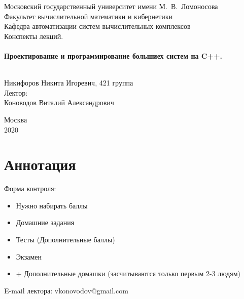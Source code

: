\documentclass[a4paper, 12pt, titlepage, finall]{extreport}
\begin{document}
    \begin{titlepage}
        \begin{center}
            {\small \sc Московский государственный университет имени М.~В.~Ломоносова\\
            Факультет вычислительной математики и кибернетики\\
            Кафедра автоматизации систем вычислительных комплексов\\}
            \vfill
            {\large \sc Конспекты лекций.}\\~\\

            {\large \bf Проектирование и программирование большиех систем на C++.}\\~\\

        \end{center}
        
        \begin{flushright}
            \vfill
            \vfill
            {Никифоров Никита Игоревич, 421 группа}\\
            {Лектор:}\\
            {Коноводов Виталий Александрович}\\
        \end{flushright}

        \begin{center}
            \vfill
            {\small Москва\\2020}
        \end{center}
    \end{titlepage}

    \chapter*{Аннотация}
        Форма контроля:
        \begin{itemize}
            \item Нужно набирать баллы
            \item Домашние задания
            \item Тесты (Дополнительные баллы)
            \item Экзамен
            \item + Дополнительные домашки (засчитываются только первым 2-3 людям)
        \end{itemize}
        E-mail лектора: vkonovodov@gmail.com
    \newpage
    \tableofcontents
    \newpage
\end{document}
